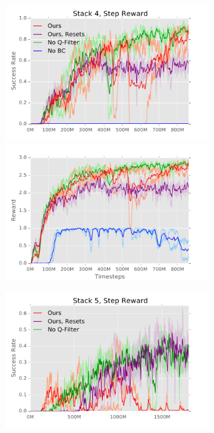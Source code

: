 \documentclass[letterpaper, 10 pt, conference]{ieeeconf}  %
\begin{document}
\begin{figure}[t]%
    \vspace{6pt}
    \centering
    \begin{subfigure}{0.3\linewidth}
        \includegraphics[width=1.0\linewidth]{figs/4a_success}
        \includegraphics[width=1.0\linewidth]{figs/4a_reward}
    \end{subfigure}
    \begin{subfigure}{0.3\linewidth}
        \includegraphics[width=1.0\linewidth]{figs/5_success}

\end{subfigure}
\end{figure}
\end{document}
